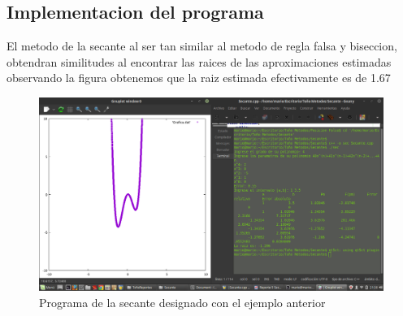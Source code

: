 \documentclass{article}
\begin{document}
\begin{multicols}{2}
\section{Implementacion del programa}
\label{sec:Imp}
El metodo de la secante al ser tan similar al metodo de regla falsa y biseccion, obtendran similitudes al encontrar las raices de las aproximaciones estimadas
observando la figura obtenemos que la raiz estimada efectivamente es de 1.67
\begin{figure}[H]
\centering
\includegraphics[scale=.125]{Secante.png}
\caption{Programa de la secante designado con el ejemplo anterior}
\end{figure}



\end{multicols}
\end{document}
